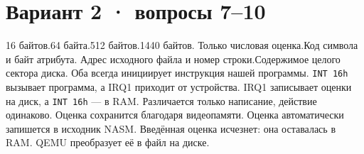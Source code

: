 \documentclass[a4paper,12pt]{extarticle}
\begin{document}

\newpage
\section*{Вариант 2 · вопросы 7–10}
\begin{enumerate}
\setcounter{enumi}{6}
\setlength{\itemsep}{6mm}
  {16 байтов.}{64 байта.}{512 байтов.}{1440 байтов.}
  {Только числовая оценка.}{Код символа и байт атрибута.}
  {Адрес исходного файла и номер строки.}{Содержимое целого сектора диска.}
  {Оба всегда инициирует инструкция нашей программы.}
  {\texttt{INT 16h} вызывает программа, а IRQ1 приходит от устройства.}
  {IRQ1 записывает оценки на диск, а \texttt{INT 16h} — в RAM.}
  {Различается только написание, действие одинаково.}
  {Оценка сохранится благодаря видеопамяти.}
  {Оценка автоматически запишется в исходник NASM.}
  {Введённая оценка исчезнет: она оставалась в RAM.}
  {QEMU преобразует её в файл на диске.}
\end{enumerate}
\answergrid
\end{document}
